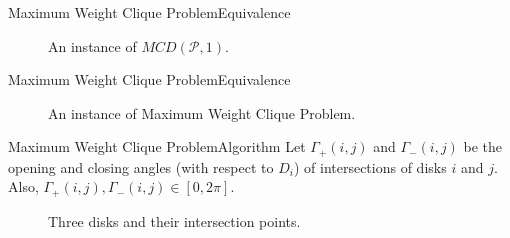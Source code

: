 \documentclass{beamer}
\newcommand{\Pp}{\mathscr{P}}
\begin{document}
\begin{frame}{Maximum Weight Clique Problem}{Equivalence}
		\begin{figure}[H]
		\centering
		
		\caption{An instance of $MCD(\Pp,1)$.}
		\label{fig:mcd_instance}
	\end{figure}
\end{frame}

\begin{frame}{Maximum Weight Clique Problem}{Equivalence}
	\begin{figure}[H]
		\centering
		
		\caption{An instance of Maximum Weight Clique Problem.}
		\label{fig:max_wieght_clique}
	\end{figure}
\end{frame}

\begin{frame}{Maximum Weight Clique Problem}{Algorithm}
	Let $\Gamma_+(i,j)$ and $\Gamma_-(i,j)$ be the opening and closing angles (with respect to $D_i$) of intersections of disks $i$ and $j$. Also, $\Gamma_+(i,j), \Gamma_-(i,j) \in [0,2\pi]$.
	\begin{figure}[H]
		\centering
		
		\caption{Three disks and their intersection points.}
		
		\label{fig:3disks_intersect}
	\end{figure}
\end{frame}
\end{document}
